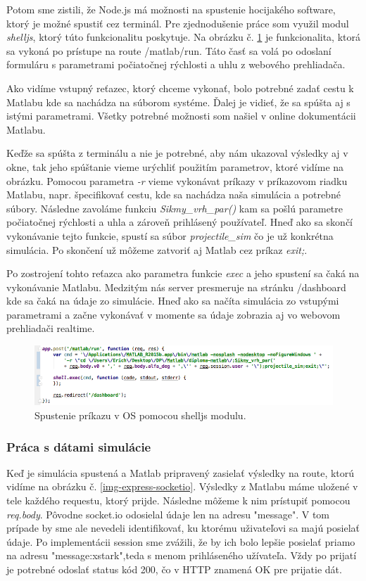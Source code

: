 Potom sme zistili, že Node.js má možnosti na spustenie hocijakého software, ktorý je možné spustiť cez terminál. Pre zjednodušenie práce som využil modul \textit{shelljs}, ktorý túto funkcionalitu poskytuje. Na obrázku č. \ref{img-express-shelljs} je funkcionalita, ktorá sa vykoná po prístupe na route /matlab/run. Táto časť sa volá po odoslaní formuláru s parametrami počiatočnej rýchlosti a uhlu z webového prehliadača.

Ako vidíme vstupný reťazec, ktorý chceme vykonať, bolo potrebné zadať cestu k Matlabu kde sa nachádza na súborom systéme. Ďalej je vidieť, že sa spúšta aj s istými parametrami. Všetky potrebné možnosti som našiel v online dokumentácii Matlabu. \cite{matlab-macos}

Keďže sa spúšta z terminálu a nie je potrebné, aby nám ukazoval výsledky aj v okne, tak jeho spúštanie vieme urýchliť použitím parametrov, ktoré vidíme na obrázku. Pomocou parametra \textit{-r} vieme vykonávat príkazy v príkazovom riadku Matlabu, napr. špecifikovať cestu, kde sa nachádza naša simulácia a potrebné súbory. Následne zavoláme funkciu \textit{Sikmy\_vrh\_par()} kam sa pošlú parametre počiatočnej rýchlosti a uhla a zároveň prihlásený používateľ. Hneď ako sa skončí vykonávanie tejto funkcie, spustí sa súbor \textit{projectile\_sim} čo je už konkrétna simulácia. Po skončení už môžeme zatvoriť aj Matlab cez príkaz \textit{exit;}.

Po zostrojení tohto reťazca ako parametra funkcie \textit{exec} a jeho spustení sa čaká na vykonávanie Matlabu. Medzitým nás server presmeruje na stránku /dashboard kde sa čaká na údaje zo simulácie. Hneď ako sa načíta simulácia zo vstupými parametrami a začne vykonávať v momente sa údaje zobrazia aj vo webovom prehliadači realtime.

\begin{figure}[H]
  \centering
  \includegraphics[scale=0.6]{img/code/express-shelljs.png}
  \caption{Spustenie príkazu v OS pomocou shelljs modulu.}
  \label{img-express-shelljs}
\end{figure}

\subsubsection{Práca s dátami simulácie}
Keď je simulácia spustená a Matlab pripravený zasielať výsledky na route, ktorú vidíme na obrázku č. \ref{img-express-socketio}. Výsledky z Matlabu máme uložené v tele každého requestu, ktorý prijde. Následne môžeme k nim prístupiť pomocou \textit{req.body}. Pôvodne socket.io odosielal údaje len na adresu "message". V tom prípade by sme ale nevedeli identifikovať, ku ktorému uživateľovi sa majú posielať údaje. Po implementácii session sme zvážili, že by ich bolo lepšie posielať priamo na adresu "message:xstark",teda s menom prihláseného užívateľa. Vždy po prijatí je potrebné odoslať status kód 200, čo v HTTP znamená OK pre prijatie dát.

